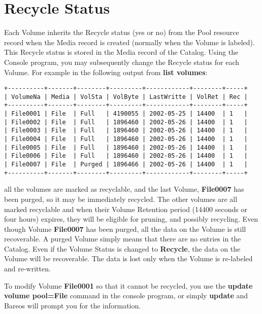 \section{Recycle Status}

Each Volume inherits the Recycle status (yes or no) from the Pool resource
record when the Media record is created (normally when the Volume is labeled).
This Recycle status is stored in the Media record of the Catalog. Using
the Console program, you may subsequently change the Recycle status for each
Volume. For example in the following output from {\bf list volumes}:

\footnotesize
\begin{verbatim}
+----------+-------+--------+---------+------------+--------+-----+
| VolumeNa | Media | VolSta | VolByte | LastWritte | VolRet | Rec |
+----------+-------+--------+---------+------------+--------+-----+
| File0001 | File  | Full   | 4190055 | 2002-05-25 | 14400  | 1   |
| File0002 | File  | Full   | 1896460 | 2002-05-26 | 14400  | 1   |
| File0003 | File  | Full   | 1896460 | 2002-05-26 | 14400  | 1   |
| File0004 | File  | Full   | 1896460 | 2002-05-26 | 14400  | 1   |
| File0005 | File  | Full   | 1896460 | 2002-05-26 | 14400  | 1   |
| File0006 | File  | Full   | 1896460 | 2002-05-26 | 14400  | 1   |
| File0007 | File  | Purged | 1896466 | 2002-05-26 | 14400  | 1   |
+----------+-------+--------+---------+------------+--------+-----+
\end{verbatim}
\normalsize

all the volumes are marked as recyclable, and the last Volume, {\bf File0007}
has been purged, so it may be immediately recycled. The other volumes are all
marked recyclable and when their Volume Retention period (14400 seconds or four
hours) expires, they will be eligible for pruning, and possibly recycling.
Even though Volume {\bf File0007} has been purged, all the data on the Volume
is still recoverable. A purged Volume simply means that there are no entries
in the Catalog. Even if the Volume Status is changed to {\bf Recycle}, the
data on the Volume will be recoverable. The data is lost only when the Volume
is re-labeled and re-written.

To modify Volume {\bf File0001} so that it cannot be recycled, you use the
{\bf update volume pool=File} command in the console program, or simply {\bf
update} and Bareos will prompt you for the information.

